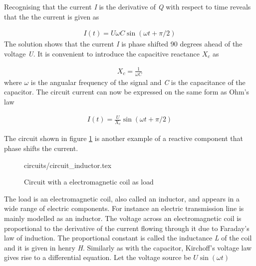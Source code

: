 \documentclass[class=book, crop=false]{standalone}
\begin{document}
Recognising that the current \textit{I} is the derivative of \textit{Q} with respect to time reveals that the the current is given as

\begin{equation}
   \begin{aligned}\label{eq:theory:capacitance_diffeq_solved}
I(t) = U\omega C \sin{(\omega t + \pi/2)}
\end{aligned} 
\end{equation}
The solution shows that the current \textit{I} is phase shifted 90 degrees ahead of the voltage \textit{U}. It is convenient to introduce the capacitive reactance $X_{c}$ as



\begin{equation}
   \begin{aligned}\label{eq:theory:reactance_capacitive}
X_{c} = \frac{1}{\omega C}
\end{aligned} 
\end{equation}
where $\omega$ is the angualar frequency of the signal and \textit{C} is the capacitance of the capacitor. The circuit current can now be expressed on the same form as Ohm's law

\begin{equation}
   \begin{aligned}\label{eq:theory:capacitance_diffeq_solved_ohm}
I(t) = \frac{U}{X_{c}} \sin(\omega t + \pi/2)
\end{aligned} 
\end{equation}

The circuit shown in figure \ref{fig:theory:circuit_inductor} is another example of a reactive component that phase shifts the current. 

\begin{figure}[ht!]
    \center
    {circuits/circuit_inductor.tex}
    \caption[size = 9]
    {Circuit with a electromagnetic coil as load}\label{fig:theory:circuit_inductor}
\end{figure}

The load is an electromagnetic coil, also called an inductor, and appears in a wide range of electric components. For instance an electric transmission line is mainly modelled as an inductor. The voltage  across an electromagnetic coil is proportional to the derivative of the current flowing through it due to Faraday's law of induction. The proportional constant is called the inductance \textit{L} of the coil and it is given in henry \textit{H}. Similarly as with the capacitor, Kirchoff's voltage law  gives rise to a differential equation. Let the voltage source be $U\sin{(\omega t)}$
\end{document}
